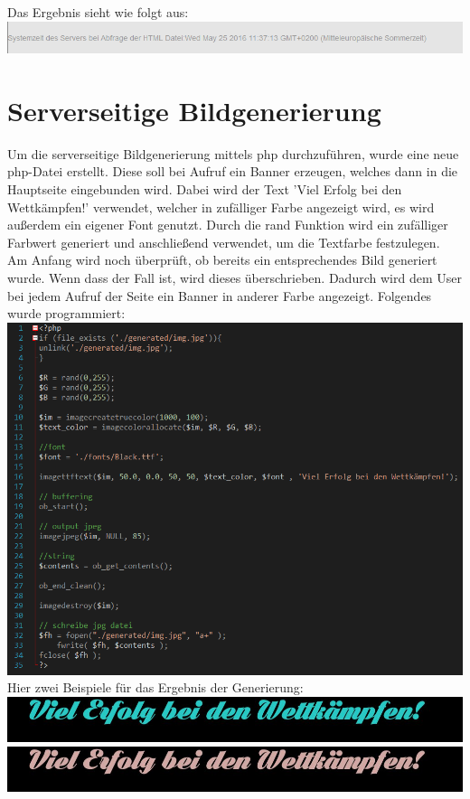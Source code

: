 \newline
Das Ergebnis sieht wie folgt aus:
\newline
\includegraphics[width=1\textwidth]{img/vincent/abb17.png}
\newline

\section{Serverseitige Bildgenerierung}
Um die serverseitige Bildgenerierung mittels php durchzuf\"uhren, wurde eine neue php-Datei erstellt. Diese soll bei Aufruf ein Banner erzeugen, welches dann in die Hauptseite eingebunden wird. Dabei wird der Text 'Viel Erfolg bei den Wettk\"ampfen!' verwendet, welcher in zuf\"alliger Farbe angezeigt wird, es wird außerdem ein eigener Font genutzt. Durch die rand Funktion wird ein zuf\"alliger Farbwert generiert und anschließend verwendet, um die Textfarbe festzulegen. Am Anfang wird noch \"uberpr\"uft, ob bereits ein entsprechendes Bild generiert wurde. Wenn dass der Fall ist, wird dieses \"uberschrieben. Dadurch wird dem User bei jedem Aufruf der Seite ein Banner in anderer Farbe angezeigt. Folgendes wurde programmiert:
\newline
\includegraphics[width=1\textwidth]{img/vincent/abb10.png}
\newline
Hier zwei Beispiele f\"ur das Ergebnis der Generierung:
\newline
\includegraphics[width=1\textwidth]{img/vincent/img.jpg}
\includegraphics[width=1\textwidth]{img/vincent/img2.jpg}
\newline

